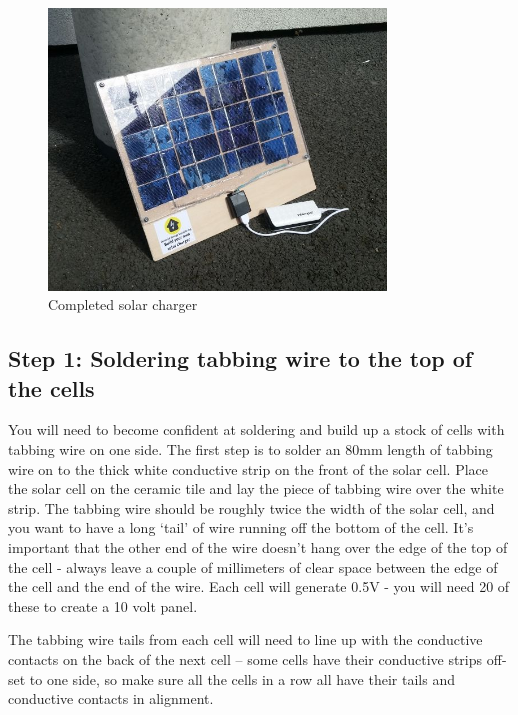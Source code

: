 \documentclass{article}
\theoremstyle{definition}
\theoremstyle{definition}
\theoremstyle{remark}
\begin{document}
\begin{figure}[!ht]
\begin{minipage}{0.25\textwidth}
        \includegraphics[width=0.8\textwidth]{../Images/image_3_12_(completed).png}
        \caption*{Completed solar charger}
    \end{minipage}
  \end{figure}

  {\color{blue}\subsection{Step 1: Soldering tabbing wire to the top of the cells}} %
  \label{sub:step_1_soldering_tabbing_wire_to_the_top_of_the_cells}

    You will need to become confident at soldering and build up a stock of cells with tabbing wire on one side. The first step is to solder an 80mm length of tabbing wire on to the thick white conductive strip on the front of the solar cell. Place the solar cell on the ceramic tile and lay the piece of tabbing wire over the white strip. The tabbing wire should be roughly twice the width of the solar cell, and you want to have a long ‘tail’ of wire running off the bottom of the cell. It’s important that the other end of the wire doesn’t hang over the edge of the top of the cell - always leave a couple of millimeters of clear space between the edge of the cell and the end of the wire. Each cell will generate 0.5V - you will need 20 of these to create a 10 volt panel.


    The tabbing wire tails from each cell will need to line up with the conductive contacts on the back of the next cell – some cells have their conductive strips off-set to one side, so make sure all the cells in a row all have their tails and conductive contacts in alignment.
\end{document}
